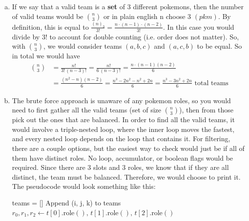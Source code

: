 \documentclass[letterpaper,11pt]{article}
\theoremstyle{plain}
\theoremstyle{definition}
\begin{document}
{\color{blue}
\begin{enumerate}[a)]
    \item
    If we say that a valid team is a \textbf{set} of $3$ different pokemons, then the number of valid teams would be $\binom{n}{3}$ or in plain english n choose 3 $(pkm)$. By definition, this is equal to $\frac{(n)_3}{3!} = \frac{n \cdot (n-1) \cdot (n-2)}{3!}$. In this case you would divide by $3!$ to account for double counting (i.e. order does not matter). So, with $\binom{n}{3}$, we would consider teams $(a, b, c)$ and $(a, c, b)$ to be equal. So in total we would have
    \begin{align*}
        \binom{n}{3} &= \frac{n!}{3!\,(n-3)!} = \frac{n!}{6\,(n-3)!} = \frac{n \cdot (n-1)(n-2)}{6} \\[6pt]
        &= \frac{(n^2 - n)(n-2)}{6} = \frac{n^3 - 2n^2 - n^2 + 2n}{6} = \frac{n^3 - 3n^2 + 2n}{6} \text{ total teams}
        \end{align*}
    \item
    The brute force approach is unaware of any pokemon roles, so you would need to first gather all the valid teams (set of size $\binom n3$), then from those pick out the ones that are balanced. In order to find all the valid teams, it would involve a triple-nested loop, where the inner loop moves the fastest, and every nested loop depends on the loop that contains it. For filtering, there are a couple options, but the easiest way to check would just be if all of them have distinct roles. No loop, accumulator, or boolean flags would be required. Since there are 3 slots and 3 roles, we know that if they are all distinct, the team must be balanced. Therefore, we would choose to print it. The pseudocode would look something like this:
    \begin{algorithm}[H]
    \caption{Brute Force Balanced Teams}\label{alg:cap}
    \begin{algorithmic}[1] %
        \State teams = []
                    \State Append (i, j, k) to teams
                \EndFor
            \EndFor
        \EndFor
        \State $r_0, r_1, r_2 \gets t[0].\text{role}(),\, t[1].\text{role}(),\, t[2].\text{role}()$

\end{algorithmic}
\end{algorithm}
\end{enumerate}}
\end{document}
